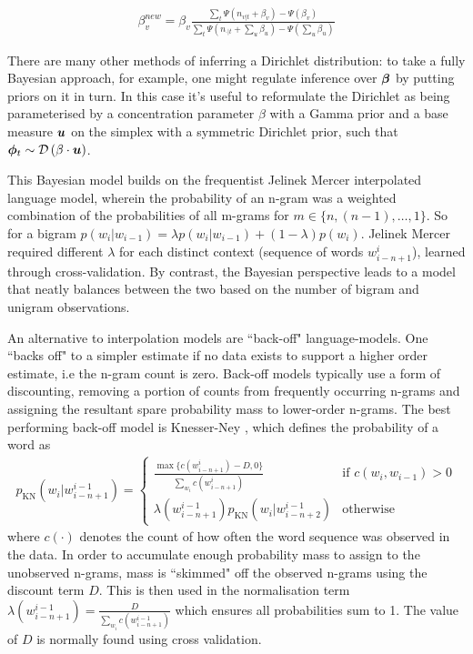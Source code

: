 \begin{align}
\beta^{new}_v = \beta_v \frac{
        \sum_t \Psi(n_{v|t} + \beta_v) - \Psi(\beta_v)
    }{
        \sum_t \Psi(n_{\cdot|t} + \sum_u \beta_u) - \Psi(\sum_u \beta_u)
    }
\end{align}


There are many other methods of inferring a Dirichlet distribution\cite{Minka2000}: to take a fully Bayesian approach, for example, one might regulate inference over $\bm \beta$ by putting priors on it in turn. In this case it's useful to reformulate the Dirichlet as being parameterised by a concentration parameter $\beta$ with a Gamma prior and a base measure $\bm u$ on the simplex with a symmetric Dirichlet prior, such that $\bm \phi_t  \sim \mathcal{D} \left( {\beta \cdot \bm u} \right)$.


This Bayesian model builds on the frequentist Jelinek Mercer\cite{JelinekMercer1980} interpolated language model, wherein the probability of an n-gram was a weighted combination of the probabilities of all m-grams for $m \in \{n, (n-1), \ldots, 1\}$. So for a bigram $p(w_i|w_{i-1}) = \lambda p(w_i|w_{i-1}) + (1 - \lambda) p(w_i)$. Jelinek Mercer required different $\lambda$ for each distinct context (sequence of words $w^i_{i-n+1}$), learned through cross-validation. By contrast, the Bayesian perspective leads to a model that neatly balances between the two based on the number of bigram and unigram observations.

An alternative to interpolation models are ``back-off" language-models. One ``backs off" to a simpler estimate if no data exists to support a higher order estimate, i.e the n-gram count is zero. Back-off models typically use a form of discounting, removing a portion of counts from frequently occurring n-grams and assigning the resultant spare probability mass to lower-order n-grams. The best performing back-off model is Knesser-Ney \cite{Chen1999} , which defines the probability of a word as 
\begin{align}
p_\text{KN}(w_i | w^{i-1}_{i-n+1}) = \left\{ \begin{array}{lr}
     \frac{\max\{c(w^i_{i-n+1}) - D, 0\}}{\sum_{w_i} c(w^i_{i-n+1})} & \text{if } c(w_i, w_{i-1}) > 0 \\
     \lambda(w^{i-1}_{i-n+1}) p_\text{KN}(w_i | w^{i-1}_{i-n+2}) & \text{otherwise}
 \end{array}
\right.
\end{align}
where $c(\cdot)$ denotes the count of how often the word sequence was observed in the data. In order to accumulate enough probability mass to assign to the unobserved n-grams, mass is ``skimmed" off the observed n-grams using the discount term $D$. This is then used in the normalisation term $\lambda(w^{i-1}_{i-n+1}) = \frac{D}{\sum_{w_i} c(w^{i-1}_{i-n+1})}$ which ensures all probabilities sum to 1. The value of $D$ is normally found using cross validation.

